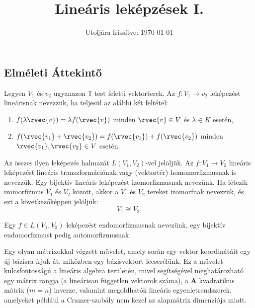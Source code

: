 \documentclass[a4paper, 12pt]{scrartcl}
\title{Lineáris leképzések I.}
\date{Utoljára frissítve: \today}
\begin{document}
\maketitle
\subsection{Elméleti Áttekintő}

\begin{definition}
  Legyen $V_1$ és $v_2$ ugyanazon $\mathbb{T}$ test feletti vektorterek. Az $f : V_1 \to v_2$ leképezést lineárisnak nevezzük, ha teljesül az alábbi két feltétel:

  \begin{enumerate}
    \item $f(\lambda \rvec{v}) = \lambda f(\rvec{v})$ minden $\rvec{v} \in V$ és $\lambda \in K$ esetén,
    \item $f(\rvec{v_1} + \rvec{v_2}) = f(\rvec{v_1}) + f(\rvec{v_2})$ minden $\rvec{v_1}, \rvec{v_2} \in V$ esetén.
  \end{enumerate}

  Az összes ilyen leképezés halmazát $L(V_1, V_2)$-vel jelöljük. Az $f : V_1 \to V_2$ lineáris leképezést lineáris transzformációnak vagy (vektortér) homomorfizmusnak is nevezzük. Egy bijektív lineáris leképezést izomorfizmusnak nevezünk. Ha létezik izomorfizmus $V_1$ és $V_2$ között, akkor a $V_1$ és $V_2$ tereket izomorfnak nevezzük, és ezt a következőképpen jelöljük:
  \[
    V_1 \cong V_2.
  \]

  Egy $f \in L(V_1, V_2)$ leképezést endomorfizmusnak nevezünk, egy bijektív endomorfizmust pedig automorfizmusnak.

\end{definition}

\begin{definition}[Bázistranszformáció]
  Egy olyan mátrixokkal végzett művelet, amely során egy vektor koordinátáit egy új bázisra írjuk át, miközben egy bázisvektort lecserélünk. Ez a művelet kulcsfontosságú a lineáris algebra területén, mivel segítségével meghatározható egy mátrix rangja (a lineárisan független vektorok száma), a $\textbf{A}$ kvadratikus mátrix ($m = n$) inverze, valamint megoldhatók lineáris egyenletrendszerek, amelyeket például a Cramer-szabály nem kezel az alapmátrix dimenziója miatt.

\end{definition}
\end{document}
